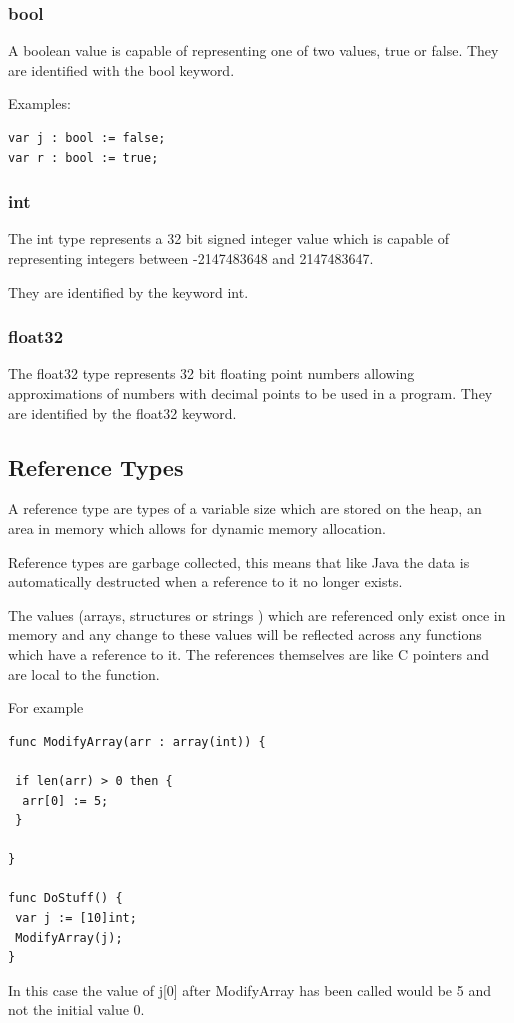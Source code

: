 \documentclass[]{final_report}
\begin{document}
\subsubsection{bool}

A boolean value is capable of representing one of two values, true or false. They are identified with the bool keyword.

Examples:
\begin{verbatim}
var j : bool := false;
var r : bool := true;
\end{verbatim}

\subsubsection{int}

The int type represents a 32 bit signed integer value which is capable of representing integers between -2147483648 and 2147483647.

They are identified by the keyword int. 

\subsubsection{float32}

The float32 type represents 32 bit floating point numbers allowing approximations of numbers with decimal points to be used in a program. They are identified by the float32 keyword.

\subsection{Reference Types}

A reference type are types of a variable size which are stored on the heap, an area in memory which allows for dynamic memory allocation.

Reference types are garbage collected, this means that like Java the data is automatically destructed when a reference to it no longer exists.

The values (arrays, structures or strings ) which are referenced only exist once in memory and any change to these values will be reflected across any functions which have a reference to it. The references themselves are like C pointers and are local to the function.

For example
\begin{verbatim}
func ModifyArray(arr : array(int)) {

 if len(arr) > 0 then {
  arr[0] := 5;
 }

}

func DoStuff() {
 var j := [10]int;
 ModifyArray(j);
}
\end{verbatim}
In this case the value of j[0] after ModifyArray has been called would be 5 and not the initial value 0.
\end{document}
